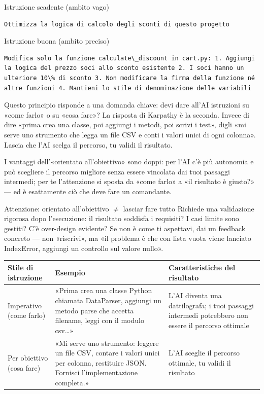 Istruzione scadente (ambito vago)

\begin{lstlisting}
Ottimizza la logica di calcolo degli sconti di questo progetto
\end{lstlisting}

Istruzione buona (ambito preciso)

\begin{lstlisting}
Modifica solo la funzione calculate\_discount in cart.py: 1. Aggiungi la logica del prezzo soci allo sconto esistente 2. I soci hanno un ulteriore 10\% di sconto 3. Non modificare la firma della funzione né altre funzioni 4. Mantieni lo stile di denominazione delle variabili
\end{lstlisting}


Questo principio risponde a una domanda chiave: devi dare all'AI istruzioni su «come farlo» o su «cosa fare»? La risposta di Karpathy è la seconda. Invece di dire «prima crea una classe, poi aggiungi i metodi, poi scrivi i test», digli «mi serve uno strumento che legga un file CSV e conti i valori unici di ogni colonna». Lascia che l'AI scelga il percorso, tu validi il risultato.

I vantaggi dell'«orientato all'obiettivo» sono doppi: per l'AI c'è più autonomia e può scegliere il percorso migliore senza essere vincolata dai tuoi passaggi intermedi; per te l'attenzione si sposta da «come farlo» a «il risultato è giusto?» — ed è esattamente ciò che deve fare un comandante.

\begin{tcbwarn}{Attenzione: orientato all'obiettivo $\neq$ lasciar fare tutto}
Richiede una validazione rigorosa dopo l'esecuzione: il risultato soddisfa i requisiti? I casi limite sono gestiti? C'è over-design evidente? Se non è come ti aspettavi, dai un feedback concreto — non «riscrivi», ma «il problema è che con lista vuota viene lanciato IndexError, aggiungi un controllo sul valore nullo».

\end{tcbwarn}

\begin{center}
\begin{tabularx}{\linewidth}{|X|X|X|}
\hline
\textbf{Stile di istruzione} & \textbf{Esempio} & \textbf{Caratteristiche del risultato} \tabularnewline
\hline
Imperativo (come farlo) & «Prima crea una classe Python chiamata DataParser, aggiungi un metodo parse che accetta filename, leggi con il modulo csv…» & L'AI diventa una dattilografa; i tuoi passaggi intermedi potrebbero non essere il percorso ottimale \tabularnewline
Per obiettivo (cosa fare) & «Mi serve uno strumento: leggere un file CSV, contare i valori unici per colonna, restituire JSON. Fornisci l'implementazione completa.» & L'AI sceglie il percorso ottimale, tu validi il risultato \tabularnewline
\hline
\end{tabularx}
\end{center}

